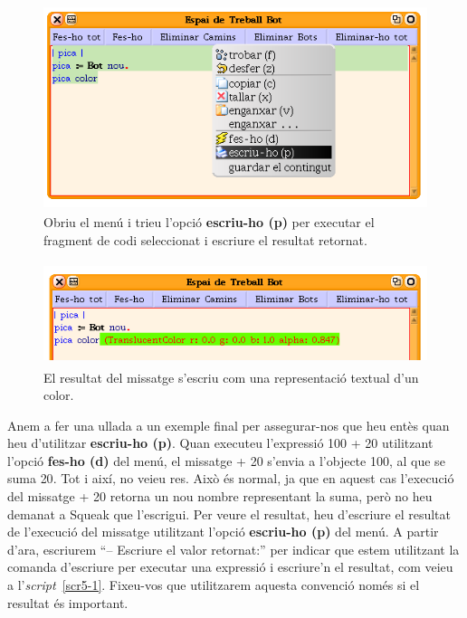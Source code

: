 \begin{figure}[h!]
\begin{center}
\includegraphics[height=60mm ,width=115mm ]{Imatges/figura5-11.png}
\end{center}
\caption{Obriu el menú i trieu l'opció \textbf{\upshape escriu-ho (p)} per executar el fragment de codi seleccionat i escriure el resultat retornat.}
\label{fig0511}
\end{figure}

\begin{figure}[h!]
\begin{center}
\includegraphics[height=30mm ,width=122mm ]{Imatges/figura5-12.png}
\end{center}
\caption{El resultat del missatge s'escriu com una representació textual d'un color.}
\label{fig0512}
\end{figure}

Anem a fer una ullada a un exemple final per assegurar-nos que heu entès quan heu d'utilitzar \textbf{escriu-ho (p)}. Quan executeu l'expressió \textsf{100 + 20} utilitzant l'opció \textbf{fes-ho (d)} del menú, el missatge \textsf{+ 20} s'envia a l'objecte  \textsf{100}, al que se suma  \textsf{20}. Tot i així, no veieu res. Això és normal, ja que en aquest cas l'execució del missatge  \textsf{+ 20} retorna un nou nombre representant la suma, però no heu demanat a Squeak que l'escrigui. Per veure el resultat, heu d'escriure el resultat de l'execució del missatge utilitzant l'opció \textbf{escriu-ho (p)} del menú. A partir d'ara, escriurem ``\textsf{-- Escriure el valor retornat:}'' per indicar que estem utilitzant la comanda d'escriure per executar una expressió i escriure'n el resultat, com veieu a l'\emph{script}~\ref{scr5-1}. Fixeu-vos que utilitzarem aquesta convenció només si el resultat és important.    

